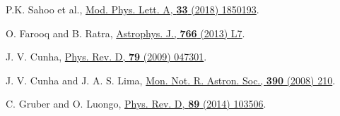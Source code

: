 \begin{thebibliography}{90}
 P.K. Sahoo et al., \href{https://doi.org/10.1142/S0217732318501936}{Mod. Phys. Lett. A, \textbf{33} (2018) 1850193}.

 O. Farooq and B. Ratra, \href{https://doi.org/10.1088/2041-8205/766/1/l7}{Astrophys. J., \textbf{766}  (2013) L7}.

 J. V. Cunha, \href{https://doi.org/10.1103/PhysRevD.79.047301}{Phys. Rev. D, \textbf{79} (2009) 047301}.

 J. V. Cunha and J. A. S. Lima, \href{https://doi.org/10.1111/j.1365-2966.2008.13640.x}{Mon. Not. R. Astron. Soc., \textbf{390} (2008) 210}.

 C. Gruber and  O. Luongo, \href{https://doi.org/10.1103/PhysRevD.89.103506}{Phys. Rev. D, \textbf{89} (2014) 103506}. 

\end{thebibliography}

